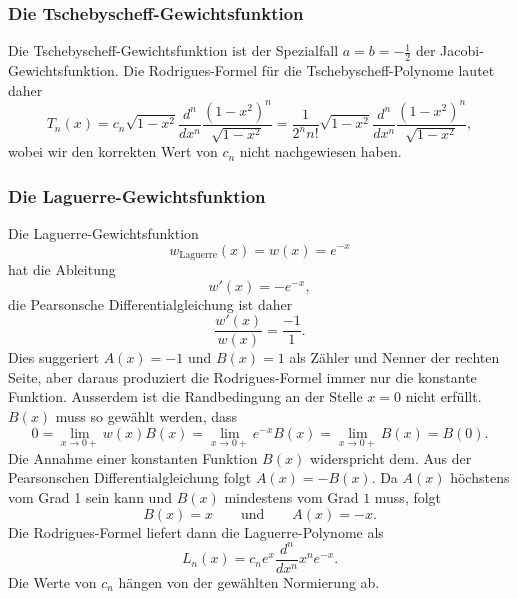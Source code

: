 %
%
\subsubsection{Die Tschebyscheff-Gewichtsfunktion}
Die Tschebyscheff-Gewichtsfunktion ist der Spezialfall $a=b=-\frac12$
der Jacobi-Gewichtsfunktion.
%
%
Die Rodrigues-Formel für die Tschebyscheff-Polynome lautet daher
\[
T_n(x)
=
c_n\sqrt{1-x^2} \frac{d^n}{dx^n}
\frac{(1-x^2)^n}{\sqrt{1-x^2}}
=
\frac{1}{2^nn!} \sqrt{1-x^2}
\frac{d^n}{dx^n} 
\frac{(1-x^2)^n}{\sqrt{1-x^2}},
\]
wobei wir den korrekten Wert von $c_n$ nicht nachgewiesen haben.

%
%
\subsubsection{Die Laguerre-Gewichtsfunktion}
Die Laguerre-Gewichtsfunktion
%
%
\[
w_{\text{Laguerre}}(x)
=
w(x)
=
e^{-x}
\]
hat die Ableitung
\[
w'(x) = -e^{-x},
\]
die Pearsonsche Differentialgleichung ist daher
%
%
\[
\frac{w'(x)}{w(x)}=\frac{-1}{1}.
\]
Dies suggeriert $A(x)=-1$ und $B(x)=1$ als Zähler und Nenner der rechten
Seite, aber daraus produziert die Rodrigues-Formel immer nur die konstante
Funktion.
Ausserdem ist die Randbedingung an der Stelle $x=0$ nicht erfüllt.
$B(x)$ muss so gewählt werden, dass
\[
0
=
\lim_{x\to 0+} w(x)B(x)
= 
\lim_{x\to 0+} e^{-x}B(x)
=
\lim_{x\to 0+} B(x)
=
B(0).
\]
Die Annahme einer konstanten Funktion $B(x)$ widerspricht dem.
Aus der Pearsonschen Differentialgleichung folgt $A(x)=-B(x)$.
Da $A(x)$ höchstens vom Grad 1 sein kann und $B(x)$ mindestens
vom Grad $1$ muss, folgt
\[
B(x) = x
\qquad\text{und}\qquad
A(x) = -x.
\]
Die Rodrigues-Formel liefert dann die Laguerre-Polynome als
\[
L_n(x) = c_n e^x \frac{d^n}{dx^n} x^ne^{-x}.
\]
Die Werte von $c_n$ hängen von der gewählten Normierung ab.

